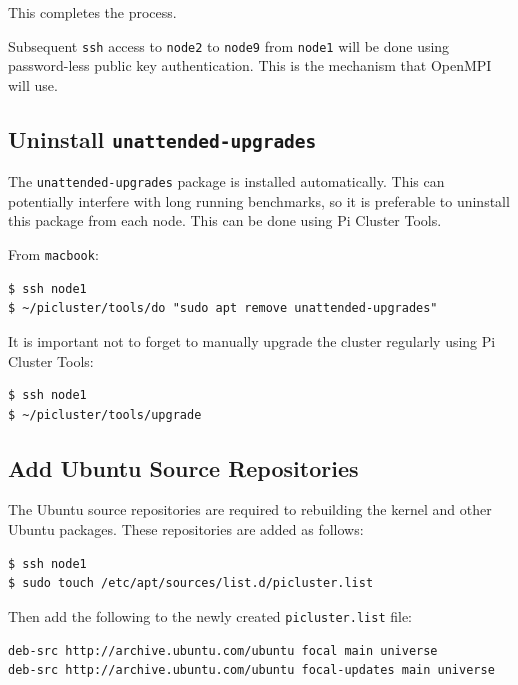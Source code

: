 \documentclass{report}
\begin{document}
This completes the process.

Subsequent \verb|ssh| access to \verb|node2| to \verb|node9| from \verb|node1| will be done using password-less public key authentication. This is the mechanism that OpenMPI will use.


%
%

\subsection{Uninstall \texttt{unattended-upgrades}}

The \verb|unattended-upgrades| package is installed automatically. This can potentially interfere with long running benchmarks, so it is preferable to uninstall this package from each node. This can be done using Pi Cluster Tools.

From \verb|macbook|:

\lstset{style=type}
\begin{lstlisting}[]
$ ssh node1
$ ~/picluster/tools/do "sudo apt remove unattended-upgrades"
\end{lstlisting}

It is important not to forget to manually upgrade the cluster regularly using Pi Cluster Tools:

\lstset{style=type}
\begin{lstlisting}[]
$ ssh node1
$ ~/picluster/tools/upgrade
\end{lstlisting}



%
%
\subsection{Add Ubuntu Source Repositories}

The Ubuntu source repositories are required to rebuilding the kernel and other Ubuntu packages. These repositories are added as follows:

\lstset{style=type}
\begin{lstlisting}[]
$ ssh node1
$ sudo touch /etc/apt/sources/list.d/picluster.list
\end{lstlisting}

Then add the following to the newly created \verb|picluster.list| file:

\lstset{style=listing}
\begin{lstlisting}[caption=/etc/apt/sources.list.d/picluster.list]
deb-src http://archive.ubuntu.com/ubuntu focal main universe
deb-src http://archive.ubuntu.com/ubuntu focal-updates main universe
\end{lstlisting}
\end{document}
